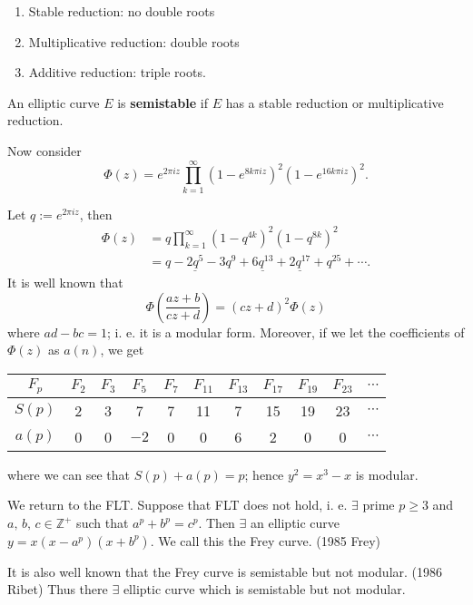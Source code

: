 
\begin{definition}
    \begin{enumerate}
        \item Stable reduction: no double roots
        \item Multiplicative reduction: double roots
        \item Additive reduction: triple roots.
    \end{enumerate}
    An elliptic curve $E$ is \textbf{semistable} if $E$ has a
    stable reduction or multiplicative reduction.
\end{definition}

Now consider
\[
    \Phi\left(z\right)=
    e^{2\pi iz}\prod_{k=1}^\infty\left(1-e^{8k\pi iz}\right)^2\left(1-e^{16k\pi iz}\right)^2.
\]

Let $q := e^{2\pi iz}$, then
\begin{align*}
    \Phi\left(z\right) &= q \prod_{k=1}^\infty \left(1-q^{4k}\right)^2\left(1-q^{8k}\right)^2\\
    &= q-\underline{2q^5}-3q^9+\underline{6q^13}+\underline{2q^17}+q^25+\cdots.
\end{align*}
It is well known that
\[
    \Phi\left(\frac{az+b}{cz+d}\right)=\left(cz+d\right)^2\Phi\left(z\right)
\]
where $ad-bc=1$; i. e. it is a modular form. Moreover, if we let the
coefficients of $\Phi\left(z\right)$ as $a\left(n\right)$, we get
\begin{center}
    \begin{tabular}{c|cccccccccc}
        \hline
        $F_p$ & $F_2$ & $F_3$ & $F_5$ & $F_7$ & $F_{11}$ & $F_{13}$ & $F_{17}$ & $F_{19}$ & $F_{23}$ & $\cdots$ \\
        \hline
        $S\left(p\right)$ & 2 & 3 & 7 & 7 & 11 & 7 & 15 & 19 & 23 & $\cdots$ \\
        $a\left(p\right)$ & 0 & 0 & $-2$ & 0 & 0 & 6 & 2 & 0 & 0 & $\cdots$ \\
        \hline
    \end{tabular}
\end{center}
where we can see that $S\left(p\right)+a\left(p\right)=p$; hence $y^2=x^3-x$ is modular.

We return to the FLT. Suppose that FLT does not hold, i. e. $\exists$ prime
$p \geq 3$ and $a,\,b,\,c\in\mathbb{Z}^+$ such that $a^p+b^p=c^p$.
Then $\exists$ an elliptic curve $y=x\left(x-a^p\right)\left(x+b^p\right)$.
We call this the Frey curve. (1985 Frey)

It is also well known that the Frey curve is semistable but not modular. (1986 Ribet)
Thus there $\exists$ elliptic curve which is semistable but not modular.

